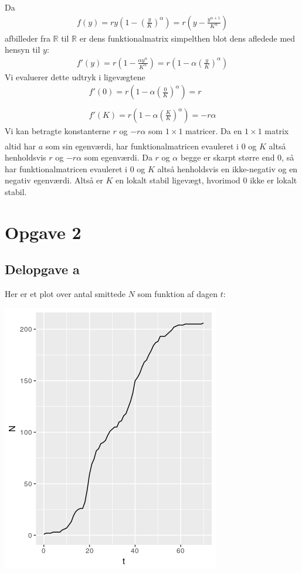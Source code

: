 \documentclass[12pt]{article}
\begin{document}
Da 
\begin{align}
f(y) = ry\left(1-\left(\frac{y}{K}\right)^\alpha\right) = r\left(y- \frac{y^{\alpha+1}}{K^\alpha}\right)
\end{align}
afbilleder fra $\mathbb{R}$ til $\mathbb{R}$ er dens funktionalmatrix simpelthen blot dens afledede med hensyn til $y$:
\begin{align}
f'(y) = r\left(1- \frac{\alpha y^{\alpha}}{K^\alpha}\right) = r\left(1- \alpha \left(\frac{y}{K}\right)^\alpha \right)
\end{align}
Vi evaluerer dette udtryk i ligevægtene
\begin{align}
f'(0) = r\left(1- \alpha \left(\frac{0}{K}\right)^\alpha \right) = r \\ \\ 
f'(K) = r\left(1- \alpha \left(\frac{K}{K}\right)^\alpha \right) = -r\alpha
\end{align}
Vi kan betragte konstanterne $r$ og $-r\alpha$ som $1\times 1$ matricer. Da en $1\times 1$ matrix
\begin{align}
[a]
\end{align}
altid har $a$ som sin egenværdi, har funktionalmatricen evauleret i 0 og $K$ altså henholdsvis $r$ og $-r\alpha$ som egenværdi. Da $r$ og $\alpha$ begge er skarpt større end 0, så har funktionalmatricen evauleret i 0 og $K$ altså henholdsvis en ikke-negativ og en negativ egenværdi. Altså er $K$ en lokalt stabil ligevægt, hvorimod 0 ikke er lokalt stabil.

\section{Opgave 2}

\subsection{Delopgave a}

Her er et plot over antal smittede $N$ som funktion af dagen $t$:
\begin{center}
\includegraphics[scale=0.8]{q2p1.png}
\end{center}
\end{document}
